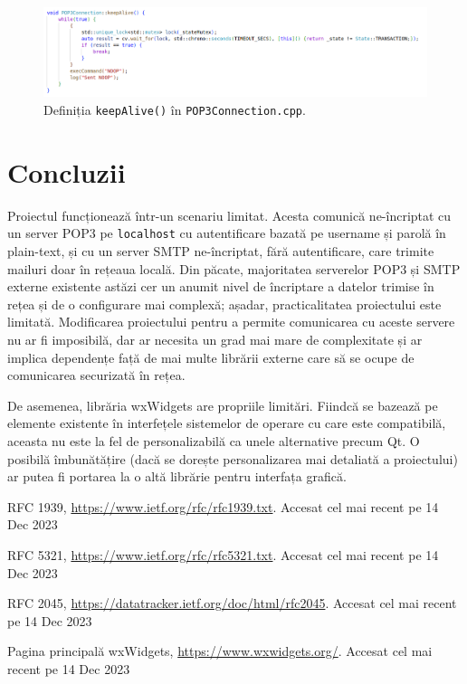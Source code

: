 \documentclass[runningheads]{llncs}
\begin{document}
\begin{figure}
    \centering
    \includegraphics[width=\textwidth]{keepAlive.png}
    \caption{Definiția \texttt{keepAlive()} în \texttt{POP3Connection.cpp}.}
    \label{fig:keepalive}
\end{figure}

\section{Concluzii}

Proiectul funcționează într-un scenariu limitat. Acesta comunică ne-încriptat cu un server POP3 pe \texttt{localhost} cu autentificare bazată pe username și parolă în plain-text, și cu un server SMTP ne-încriptat, fără autentificare, care trimite mailuri doar în rețeaua locală. Din păcate, majoritatea serverelor POP3 și SMTP externe existente astăzi cer un anumit nivel de încriptare a datelor trimise în rețea și de o configurare mai complexă; așadar, practicalitatea proiectului este limitată. Modificarea proiectului pentru a permite comunicarea cu aceste servere nu ar fi imposibilă, dar ar necesita un grad mai mare de complexitate și ar implica dependențe față de mai multe librării externe care să se ocupe de comunicarea securizată în rețea.

De asemenea, librăria wxWidgets are propriile limitări. Fiindcă se bazează pe elemente existente în interfețele sistemelor de operare cu care este compatibilă\cite{ref_wxwidgets}, aceasta nu este la fel de personalizabilă ca unele alternative precum Qt. O posibilă îmbunătățire (dacă se dorește personalizarea mai detaliată a proiectului) ar putea fi portarea la o altă librărie pentru interfața grafică.
%
%
%
% 
% 

\renewcommand\refname{Referințe bibliografice}
\begin{thebibliography}{8}
RFC 1939, \url{https://www.ietf.org/rfc/rfc1939.txt}. Accesat cel mai recent pe 14 Dec 2023

RFC 5321, \url{https://www.ietf.org/rfc/rfc5321.txt}. Accesat cel mai recent pe 14 Dec 2023

RFC 2045, \url{https://datatracker.ietf.org/doc/html/rfc2045}. Accesat cel mai recent pe 14 Dec 2023

Pagina principală wxWidgets, \url{https://www.wxwidgets.org/}. Accesat cel mai recent pe 14 Dec 2023


\end{thebibliography}
\end{document}
